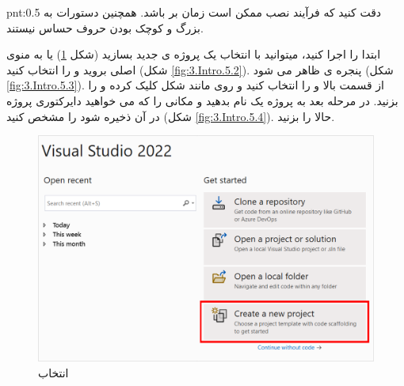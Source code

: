{\begin{spacing}{1.5}
        \begin{point}{pnt:0.5}
            دقت کنید که فرآیند نصب ممکن است زمان بر باشد. همچنین دستورات  به بزرگ و کوچک بودن حروف حساس نیستند.
        \end{point}
    \end{spacing}
} 

\textbf{\vspace{-30pt}}
\title{
    \LARGE
}
\textbf{\vspace{-10pt}}

{
    \Large
    \begin{spacing}{1.5}
        ابتدا  را اجرا کنید، میتوانید با انتخاب  یک پروژه ی جدید بسازید (شکل \ref{fig:3.Intro.5.1}) یا به منوی اصلی بروید و  را انتخاب کنید (شکل \ref{fig:3.Intro.5.2}).
        پنجره ی  ظاهر می شود (شکل \ref{fig:3.Intro.5.3}).
        از قسمت بالا  و  را انتخاب کنید و روی  مانند شکل کلیک کرده و  را بزنید.
        در مرحله بعد به پروژه یک نام بدهید و مکانی را که می خواهید دایرکتوری پروژه در آن ذخیره شود را مشخص کنید (شکل \ref{fig:3.Intro.5.4}).
        حالا  را بزنید.

        \begin{figure}[H]
            \centering
            \setlength{\belowcaptionskip}{-10pt}
            \includegraphics[width=\textwidth]{Images/3/3.Intro.5.1}
            \caption{انتخاب }
            \label{fig:3.Intro.5.1}
        \end{figure}


\end{spacing}}
